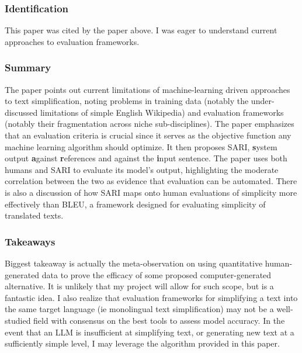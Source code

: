 \documentclass[
	letterpaper, %
]{jdf}
\begin{document}
\subsubsection{Identification}
This paper was cited by the paper above. I was eager to understand current approaches to evaluation frameworks.

\subsubsection{Summary}
The paper points out current limitations of machine-learning driven approaches to text simplification, noting problems in training data (notably the under-discussed limitations of simple English Wikipedia) and evaluation frameworks (notably their fragmentation across niche sub-disciplines). The paper emphasizes that an evaluation criteria is crucial since it serves as the objective function any machine learning algorithm should optimize. It then proposes SARI, \textbf{s}ystem output \textbf{a}gainst \textbf{r}eferences and against the \textbf{i}nput sentence. The paper uses both humans and SARI to evaluate its model's output, highlighting the moderate correlation between the two as evidence that evaluation can be automated. There is also a discussion of how SARI maps onto human evaluations of simplicity more effectively than BLEU, a framework designed for evaluating simplicity of translated texts.

\subsubsection{Takeaways}
Biggest takeaway is actually the meta-observation on using quantitative human-generated data to prove the efficacy of some proposed computer-generated alternative. It is unlikely that my project will allow for such scope, but is a fantastic idea. I also realize that evaluation frameworks for simplifying a text into the same target language (ie monolingual text simplification) may not be a well-studied field with consensus on the best tools to assess model accuracy. In the event that an LLM is insufficient at simplifying text, or generating new text at a sufficiently simple level, I may leverage the algorithm provided in this paper.
%
\subsection{}
\end{document}
